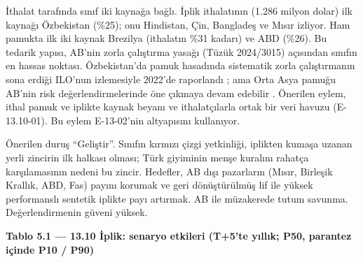İthalat tarafında sınıf iki kaynağa bağlı. İplik ithalatının (1.286 milyon dolar) ilk kaynağı Özbekistan (\%25); onu Hindistan, Çin, Bangladeş ve Mısır izliyor. Ham pamukta ilk iki kaynak Brezilya (ithalatın \%31 kadarı) ve ABD (\%26). Bu tedarik yapısı, AB'nin zorla çalıştırma yasağı (Tüzük 2024/3015) açısından sınıfın en hassas noktası. Özbekistan'da pamuk hasadında sistematik zorla çalıştırmanın sona erdiği ILO'nun izlemesiyle 2022'de raporlandı \etiketD{}; ama Orta Asya pamuğu AB'nin risk değerlendirmelerinde öne çıkmaya devam edebilir \etiketH{}. Önerilen eylem, ithal pamuk ve iplikte kaynak beyanı ve ithalatçılarla ortak bir veri havuzu (E-13.10-01). Bu eylem E-13-02'nin altyapısını kullanıyor.

Önerilen duruş ``Geliştir''. Sınıfın kırmızı çizgi yetkinliği, iplikten kumaşa uzanan yerli zincirin ilk halkası olması; Türk giyiminin menşe kuralını rahatça karşılamasının nedeni bu zincir. Hedefler, AB dışı pazarların (Mısır, Birleşik Krallık, ABD, Fas) payını korumak ve geri dönüştürülmüş lif ile yüksek performanslı sentetik iplikte payı artırmak. AB ile müzakerede tutum savunma. Değerlendirmenin güveni yüksek.


\textbf{Tablo 5.1 --- 13.10 İplik: senaryo etkileri (T+5'te yıllık; P50, parantez içinde P10 / P90)}

\nopagebreak[4]

\begingroup\gbtablo\small

